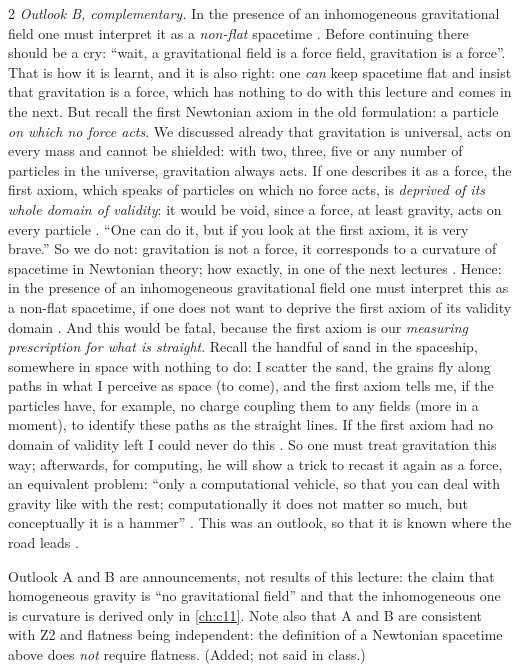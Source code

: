 \begin{paracol}{2}
\emph{Outlook B, complementary.} In the presence of an inhomogeneous gravitational field one must interpret it as a \emph{non-flat} spacetime .
Before continuing there should be a cry: ``wait, a gravitational field is a force field, gravitation is a force''. That is how it is learnt, and it is also right: one \emph{can} keep
spacetime flat and insist that gravitation is a force, which has nothing to do with this lecture and comes in the next. But recall the first Newtonian axiom in the old formulation:
a particle \emph{on which no force acts}. We discussed already that gravitation is universal, acts on every mass and cannot be shielded: with two, three, five or any number of particles in the
universe, gravitation always acts. If one describes it as a force, the first axiom, which speaks of particles on which no force acts, is \emph{deprived of its whole domain of validity}:
it would be void, since a force, at least gravity, acts on every particle . ``One can do it, but if you look at the first axiom, it is very brave.'' So we do
not: gravitation is not a force, it corresponds to a curvature of spacetime in Newtonian theory; how exactly, in one of the next lectures .
Hence: in the presence of an inhomogeneous gravitational field one must interpret this as a non-flat spacetime, if one does not want to deprive the first axiom of its
validity domain . And this would be fatal, because the first axiom is our \emph{measuring prescription for what is straight}. Recall the handful of sand in the spaceship, somewhere in
space with nothing to do: I scatter the sand, the grains fly along paths in what I perceive as space (to come), and the first axiom tells me, if the particles
have, for example, no charge coupling them to any fields (more in a moment), to identify these paths as the straight lines. If the first axiom had no domain of
validity left I could never do this . So one must treat gravitation this way; afterwards, for computing, he will show a trick to recast it again as a force, an equivalent
problem: ``only a computational vehicle, so that you can deal with gravity like with the rest; computationally it does not matter so much, but conceptually it is a hammer''
. This was an outlook, so that it is known where the road leads .

\begin{coursenote}
Outlook A and B are announcements, not results of this lecture: the claim that homogeneous gravity is ``no gravitational field'' and that the inhomogeneous
one is curvature is derived only in \cref{ch:c11}. Note also that A and B are consistent with Z2 and flatness being independent:
the definition of a Newtonian spacetime above does \emph{not} require flatness. (Added; not said in class.)
\end{coursenote}


\end{paracol}
